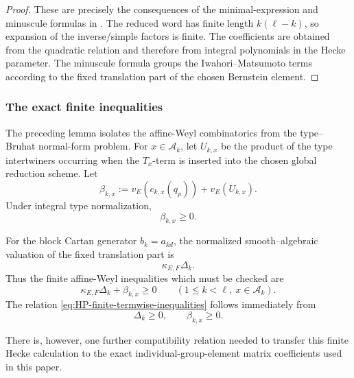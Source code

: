 \documentclass[12pt]{article}
\theoremstyle{definition}
\theoremstyle{remark}
\begin{document}
\begin{proof}
These are precisely the consequences of the minimal-expression and
minuscule formulas in \cite{HainesPettet2002}.  The reduced word has finite
length \(k(\ell-k)\), so expansion of the inverse/simple factors is finite.
The coefficients are obtained from the quadratic relation and therefore
from integral polynomials in the Hecke parameter.  The minuscule formula
groups the Iwahori--Matsumoto terms according to the fixed translation part
of the chosen Bernstein element.
\end{proof}

\subsubsection{The exact finite inequalities}

The preceding lemma isolates the affine-Weyl combinatorics from the
type--Bruhat normal-form problem.  For
\(x\in\mathcal A_k\), let \(U_{k,x}\) be the product of the type
intertwiners occurring when the \(T_x\)-term is inserted into the chosen
global reduction scheme.  Let
\[
 \beta_{k,x}
 :=
 v_E(c_{k,x}(q_\rho))
 +
 v_E(U_{k,x}).
\]
Under integral type normalization,
\begin{equation}\label{eq:HP-residual-nonnegative}
 \beta_{k,x}\geq0.
\end{equation}

For the block Cartan generator \(b_k=a_{kd}\), the normalized
smooth--algebraic valuation of the fixed translation part is
\begin{equation}\label{eq:HP-fixed-translation-value}
 \kappa_{E,F}\Delta_k.
\end{equation}
Thus the finite affine-Weyl inequalities which must be checked are
\begin{equation}\label{eq:HP-finite-termwise-inequalities}
 \boxed{
 \kappa_{E,F}\Delta_k+\beta_{k,x}\geq0
 \qquad
 (1\leq k<\ell,\ x\in\mathcal A_k).
 }
\end{equation}
The relation \eqref{eq:HP-finite-termwise-inequalities} follows immediately from
\[
 \Delta_k\geq0,
 \qquad
 \beta_{k,x}\geq0.
\]

There is, however, one further compatibility relation needed to transfer
this finite Hecke calculation to the exact individual-group-element matrix
coefficients used in this paper.
\end{document}
